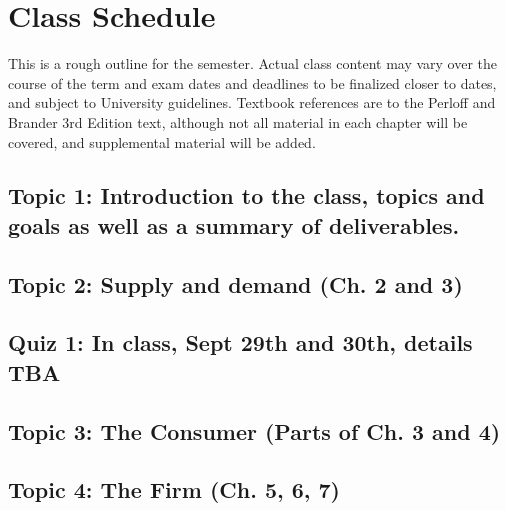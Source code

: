 \documentclass[11pt,]{article}
\begin{document}
\hypertarget{class-schedule}{%
\section{Class Schedule}\label{class-schedule}}

This is a rough outline for the semester. Actual class content may vary
over the course of the term and exam dates and deadlines to be finalized
closer to dates, and subject to University guidelines. Textbook
references are to the Perloff and Brander 3rd Edition text, although not
all material in each chapter will be covered, and supplemental material
will be added.

\hypertarget{topic-1-introduction-to-the-class-topics-and-goals-as-well-as-a-summary-of-deliverables.}{%
\subsection{Topic 1: Introduction to the class, topics and goals as well
as a summary of
deliverables.}\label{topic-1-introduction-to-the-class-topics-and-goals-as-well-as-a-summary-of-deliverables.}}

\hypertarget{topic-2-supply-and-demand-ch.-2-and-3}{%
\subsection{Topic 2: Supply and demand (Ch. 2 and
3)}\label{topic-2-supply-and-demand-ch.-2-and-3}}

\hypertarget{quiz-1-in-class-sept-29th-and-30th-details-tba}{%
\subsection{Quiz 1: In class, Sept 29th and 30th, details
TBA}\label{quiz-1-in-class-sept-29th-and-30th-details-tba}}

\hypertarget{topic-3-the-consumer-parts-of-ch.-3-and-4}{%
\subsection{Topic 3: The Consumer (Parts of Ch. 3 and
4)}\label{topic-3-the-consumer-parts-of-ch.-3-and-4}}

\hypertarget{topic-4-the-firm-ch.-5-6-7}{%
\subsection{Topic 4: The Firm (Ch. 5, 6,
7)}\label{topic-4-the-firm-ch.-5-6-7}}
\end{document}
